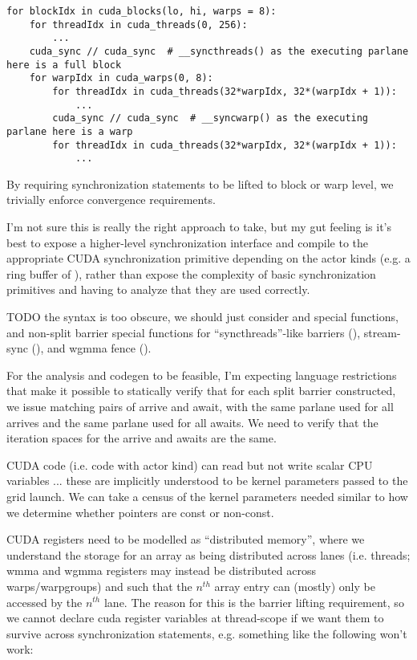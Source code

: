 {\color{lightttColor}
\begin{verbatim}
for blockIdx in cuda_blocks(lo, hi, warps = 8):
    for threadIdx in cuda_threads(0, 256):
        ...
    cuda_sync // cuda_sync  # __syncthreads() as the executing parlane here is a full block
    for warpIdx in cuda_warps(0, 8):
        for threadIdx in cuda_threads(32*warpIdx, 32*(warpIdx + 1)):
            ...
        cuda_sync // cuda_sync  # __syncwarp() as the executing parlane here is a warp
        for threadIdx in cuda_threads(32*warpIdx, 32*(warpIdx + 1)):
            ...
\end{verbatim}
}

By requiring synchronization statements to be lifted to block or warp level, we trivially enforce convergence requirements.

\filbreak
I'm not sure this is really the right approach to take, but my gut feeling is it's best to expose a higher-level synchronization interface and compile to the appropriate CUDA synchronization primitive depending on the actor kinds (e.g. a ring buffer of \mbarrier), rather than expose the complexity of basic synchronization primitives and having to analyze that they are used correctly.

\filbreak
TODO the \lighttt{//} syntax is too obscure, we should just consider  and  special functions, and non-split barrier special functions for ``syncthreads''-like barriers (), stream-sync (), and wgmma fence ().

\filbreak
{} For the analysis and codegen to be feasible, I'm expecting language restrictions that make it possible to statically verify that for each split barrier constructed, we issue matching pairs of arrive and await, with the same parlane used for all arrives and the same parlane used for all awaits.
We need to verify that the iteration spaces for the arrive and awaits are the same.

\filbreak
{} CUDA code (i.e. code with  actor kind) can read but not write scalar CPU variables ... these are implicitly understood to be kernel parameters passed to the grid launch.
We can take a census of the kernel parameters needed similar to how we determine whether pointers are const or non-const.

\filbreak
{} CUDA registers need to be modelled as ``distributed memory'', where we understand the storage for an array as being distributed across lanes (i.e. threads; wmma and wgmma registers may instead be distributed across warps/warpgroups) and such that the $n^{th}$ array entry can (mostly) only be accessed by the $n^{th}$ lane.
The reason for this is the barrier lifting requirement, so we cannot declare cuda register variables at thread-scope if we want them to survive across synchronization statements, e.g. something like the following won't work:

